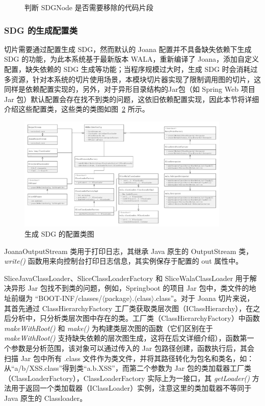 \begin{figure}[!htbp]
    \centering
    \begin{minipage}{0.9\textwidth}
        
    \end{minipage}
    \caption{判断 SDGNode 是否需要移除的代码片段}\label{code:sliceJoanaRemove}
\end{figure}


\subsubsection{SDG 的生成配置类}
切片需要通过配置生成 SDG，然而默认的 Joana 配置并不具备缺失依赖下生成 SDG 的功能，为此本系统基于最新版本 WALA，重新编译了 Joana，添加自定义配置，缺失依赖的 SDG 生成等功能；当程序规模过大时，生成 SDG 时会消耗过多资源，针对本系统的切片使用场景，本模块切片器实现了限制调用图的切片，这同样是依赖配置实现的，另外，对于异形目录结构的Jar包（如 Spring Web 项目 Jar 包）默认配置会存在找不到类的问题，这依旧依赖配置实现，因此本节将详细介绍这些配置类，这些类的类图如图~\ref{JoanaConfig} 所示。

\begin{figure}[!htb]
    \centering
    \includegraphics[width=0.9\textwidth]{FIGs/chapter4/sliceConfigClass.pdf}
    \caption{生成 SDG 的配置类图}\label{JoanaConfig}
\end{figure}

JoanaOutputStream 类用于打印日志，其继承 Java 原生的 OutputStream 类， \textit{write()} 函数用来向控制台打印日志信息，其实例保存于配置的 out 属性中。

SliceJavaClassLoader、SliceClassLoaderFactory 和 SliceWalaClassLoader 用于解决异形 Jar 包找不到类的问题，例如，Springboot 的项目 Jar 包中，类文件的地址前缀为 “BOOT-INF/classes/$\langle$package$\rangle$.$\langle$class$\rangle$.class”。对于 Joana 切片来说，其首先通过 ClassHierarchyFactory 工厂类获取类层次图（IClassHierarchy），在之后分析中，只分析类层次图中存在的类。工厂类（ClassHierarchyFactory）中函数 \textit{makeWithRoot()} 和 \textit{make()} 为构建类层次图的函数（它们区别在于 \textit{makeWithRoot()} 支持缺失依赖的层次图生成，这将在后文详细介绍），函数第一个参数是分析范围，该对象可以通过传入的 Jar 包路径创建，函数执行后，其会扫描 Jar 包中所有 .class 文件作为类文件，并将其路径转化为包名和类名，如：从“a/b/XSS.class”得到类“a.b.XSS”，而第二个参数为 Jar 包的类加载器工厂类（ClassLoaderFactory），ClassLoaderFactory 实际上为一接口，其 \textit{getLoader()} 方法用于返回一个类加载器（IClassLoader）实例，注意这里的类加载器不等同于 Java 原生的 Classloader。

